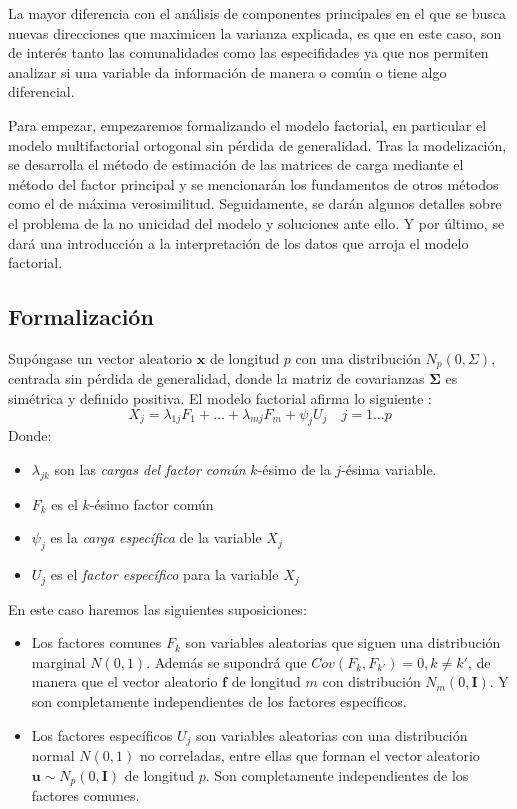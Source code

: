 \noindent La mayor diferencia con el análisis de componentes principales en el que se busca nuevas direcciones que maximicen la varianza explicada, es que en este caso, son de interés tanto las comunalidades como las especifidades ya que nos permiten analizar si una variable da información de manera o común o tiene algo diferencial. 

\noindent Para empezar, empezaremos formalizando el modelo factorial, en particular el modelo multifactorial ortogonal \cite{Johnson 2007} sin pérdida de generalidad. Tras la modelización, se desarrolla el método de estimación de las matrices de carga mediante el método del factor principal \cite{Peña 2002} y se mencionarán los fundamentos de otros métodos como el de máxima verosimilitud. Seguidamente, se darán algunos detalles sobre el problema de la no unicidad del modelo y soluciones ante ello. Y por último, se dará una introducción a la interpretación de los datos que arroja el modelo factorial. 

\newpage
\subsection{Formalización}
\noindent Supóngase un vector aleatorio $\mathbf{x}$ de longitud $p$ con una distribución $N_p(0,\Sigma)$, centrada sin pérdida de generalidad, donde la matriz de covarianzas $\mathbf{\Sigma}$ es simétrica y definido positiva. El modelo factorial afirma lo siguiente \cite{Chatfield 1989}:  
\begin{equation}\label{eq Fact}
X_j= \lambda_{1j}F_1+\ldots+\lambda_{mj}F_m+\psi_j U_j\quad j=1\ldots p 
\end{equation}
\noindent Donde:
\begin{itemize}
\item $\lambda_{jk}$ son las \emph{cargas del factor común} $k$-ésimo de la $j$-ésima variable.
\item $F_k$ es el $k$-ésimo factor común
\item $\psi_j$ es la \emph{carga específica} de la variable $X_j$
\item $U_j$ es el \emph{factor específico} para la variable $X_j$
\end{itemize}

\noindent En este caso haremos las siguientes suposiciones\cite{Cuadras 2014}:
\begin{itemize}
\item Los factores comunes $F_k$ son variables aleatorias que siguen una distribución marginal $N(0,1)$. Además se supondrá que $Cov(F_k,F_{k'})=0, k\neq k'$, de manera que el vector aleatorio $\mathbf{f}$ de longitud $m$ con distribución $N_m(0,\mathbf{I})$. Y son completamente independientes de los factores específicos. 

\item Los factores específicos $U_j$ son variables aleatorias con una distribución normal $N(0,1)$ no correladas, entre ellas  que forman el vector aleatorio $\mathbf{u}\sim N_p(0,\mathbf{I})$ de longitud $p$. Son completamente independientes de los factores comunes. 
\end{itemize}


